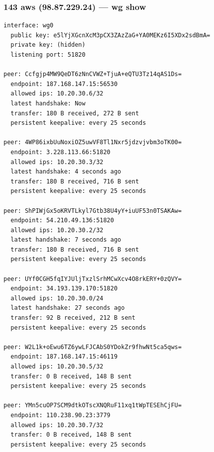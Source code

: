 \documentclass[11pt,a4paper]{article}
\begin{document}
\subsubsection*{143 aws (98.87.229.24) — wg show}
\begin{lstlisting}
interface: wg0
  public key: e5lYjXGcnXcM3pCX3ZAzZaG+YA0MEKz6I5XDx2sdBmA=
  private key: (hidden)
  listening port: 51820

peer: Ccfgjp4MW9QeDT6zNnCVWZ+TjuA+eQTU3Tz14qAS1Ds=
  endpoint: 187.168.147.15:56530
  allowed ips: 10.20.30.6/32
  latest handshake: Now
  transfer: 180 B received, 272 B sent
  persistent keepalive: every 25 seconds

peer: 4WP86ixbUuNoxiOZ5uwVF8Tl1Nxr5jdzvjvbm3oTK00=
  endpoint: 3.228.113.66:51820
  allowed ips: 10.20.30.3/32
  latest handshake: 4 seconds ago
  transfer: 180 B received, 716 B sent
  persistent keepalive: every 25 seconds

peer: ShPIWjGx5oKRVTLkyl7Gtb38U4yY+iuUF53n0TSAKAw=
  endpoint: 54.210.49.136:51820
  allowed ips: 10.20.30.2/32
  latest handshake: 7 seconds ago
  transfer: 180 B received, 716 B sent
  persistent keepalive: every 25 seconds

peer: UYf0CGH5fqIYJUljTxzlSrhMCwXcv4O8rkERY+0zQVY=
  endpoint: 34.193.139.170:51820
  allowed ips: 10.20.30.0/24
  latest handshake: 27 seconds ago
  transfer: 92 B received, 212 B sent
  persistent keepalive: every 25 seconds

peer: W2L1k+oEwu6TZ6ywLFJCAbS0YDokZr9fhwNt5ca5qws=
  endpoint: 187.168.147.15:46119
  allowed ips: 10.20.30.5/32
  transfer: 0 B received, 148 B sent
  persistent keepalive: every 25 seconds

peer: YMn5cuOP7SCM9dtkOTscXNQRuF11xq1tWpTESEhCjFU=
  endpoint: 110.238.90.23:3779
  allowed ips: 10.20.30.7/32
  transfer: 0 B received, 148 B sent
  persistent keepalive: every 25 seconds

\end{lstlisting}
\end{document}
